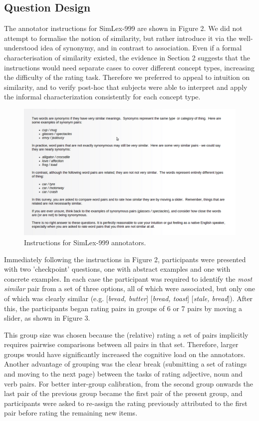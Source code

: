 \subsection{Question Design}

The annotator instructions for SimLex-999 are shown in Figure 2. We did not attempt to formalise the notion of similarity, but rather introduce it via the well-understood idea of synonymy, and in contrast to association. Even if a formal characterisation of similarity existed, the evidence in Section 2 suggests that the instructions would need separate cases to cover different concept types, increasing the difficulty of the rating task. Therefore we preferred to appeal to intuition on similarity, and to verify post-hoc that subjects were able to interpret and apply the informal characterization consistently for each concept type. 

\begin{figure}[ht]  \includegraphics[width = \textwidth]{Chapter_3/screenshot1_CL}  \caption{Instructions for SimLex-999 annotators.}\end{figure} 

Immediately following the instructions in Figure 2, participants were presented with two 'checkpoint' questions, one with abstract examples and one with concrete examples. In each case the participant was required to identify the \emph{most similar} pair from a set of three options, all of which were associated, but only one of which was clearly similar (e.g. [\emph{bread, butter}] [\emph{bread, toast}] [\emph{stale, bread}]). After this, the participants began rating pairs in groups of 6 or 7 pairs by moving a slider, as shown in Figure 3.

This group size was chosen because the (relative) rating a set of pairs implicitly requires pairwise comparisons between all pairs in that set. Therefore, larger groups would have significantly increased the cognitive load on the annotators. Another advantage of grouping was the clear break (submitting a set of ratings and moving to the next page) between the tasks of rating adjective, noun and verb pairs. For better inter-group calibration, from the second group onwards the last pair of the previous group became the first pair of the present group, and participants were asked to re-assign the rating previously attributed to the first pair before rating the remaining new items.  

